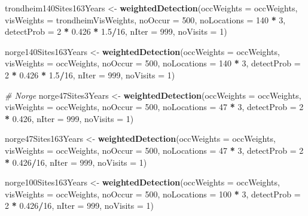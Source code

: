 \documentclass[]{article}
\newenvironment{Shaded}{\begin{snugshade}}{\end{snugshade}}
\newcommand{\KeywordTok}[1]{\textcolor[rgb]{0.13,0.29,0.53}{\textbf{#1}}}
\newcommand{\DataTypeTok}[1]{\textcolor[rgb]{0.13,0.29,0.53}{#1}}
\newcommand{\DecValTok}[1]{\textcolor[rgb]{0.00,0.00,0.81}{#1}}
\newcommand{\FloatTok}[1]{\textcolor[rgb]{0.00,0.00,0.81}{#1}}
\newcommand{\StringTok}[1]{\textcolor[rgb]{0.31,0.60,0.02}{#1}}
\newcommand{\CommentTok}[1]{\textcolor[rgb]{0.56,0.35,0.01}{\textit{#1}}}
\newcommand{\OperatorTok}[1]{\textcolor[rgb]{0.81,0.36,0.00}{\textbf{#1}}}
\newcommand{\NormalTok}[1]{#1}
\begin{document}
\begin{Shaded}
\begin{Highlighting}[]
\NormalTok{trondheim140Sites163Years <-}\StringTok{ }\KeywordTok{weightedDetection}\NormalTok{(}\DataTypeTok{occWeights =}\NormalTok{ occWeights, }\DataTypeTok{visWeights =}\NormalTok{ trondheimVisWeights, }
    \DataTypeTok{noOccur =} \DecValTok{500}\NormalTok{, }\DataTypeTok{noLocations =} \DecValTok{140} \OperatorTok{*}\StringTok{ }\DecValTok{3}\NormalTok{, }\DataTypeTok{detectProb =} \DecValTok{2} \OperatorTok{*}\StringTok{ }\FloatTok{0.426} \OperatorTok{*}\StringTok{ }\FloatTok{1.5}\OperatorTok{/}\DecValTok{16}\NormalTok{, }\DataTypeTok{nIter =} \DecValTok{999}\NormalTok{, }
    \DataTypeTok{noVisits =} \DecValTok{1}\NormalTok{)}

\NormalTok{norge140Sites163Years <-}\StringTok{ }\KeywordTok{weightedDetection}\NormalTok{(}\DataTypeTok{occWeights =}\NormalTok{ occWeights, }\DataTypeTok{visWeights =}\NormalTok{ occWeights, }
    \DataTypeTok{noOccur =} \DecValTok{500}\NormalTok{, }\DataTypeTok{noLocations =} \DecValTok{140} \OperatorTok{*}\StringTok{ }\DecValTok{3}\NormalTok{, }\DataTypeTok{detectProb =} \DecValTok{2} \OperatorTok{*}\StringTok{ }\FloatTok{0.426} \OperatorTok{*}\StringTok{ }\FloatTok{1.5}\OperatorTok{/}\DecValTok{16}\NormalTok{, }\DataTypeTok{nIter =} \DecValTok{999}\NormalTok{, }
    \DataTypeTok{noVisits =} \DecValTok{1}\NormalTok{)}


\CommentTok{# Norge}
\NormalTok{norge47Sites3Years <-}\StringTok{ }\KeywordTok{weightedDetection}\NormalTok{(}\DataTypeTok{occWeights =}\NormalTok{ occWeights, }\DataTypeTok{visWeights =}\NormalTok{ occWeights, }
    \DataTypeTok{noOccur =} \DecValTok{500}\NormalTok{, }\DataTypeTok{noLocations =} \DecValTok{47} \OperatorTok{*}\StringTok{ }\DecValTok{3}\NormalTok{, }\DataTypeTok{detectProb =} \DecValTok{2} \OperatorTok{*}\StringTok{ }\FloatTok{0.426}\NormalTok{, }\DataTypeTok{nIter =} \DecValTok{999}\NormalTok{, }
    \DataTypeTok{noVisits =} \DecValTok{1}\NormalTok{)}

\NormalTok{norge47Sites163Years <-}\StringTok{ }\KeywordTok{weightedDetection}\NormalTok{(}\DataTypeTok{occWeights =}\NormalTok{ occWeights, }\DataTypeTok{visWeights =}\NormalTok{ occWeights, }
    \DataTypeTok{noOccur =} \DecValTok{500}\NormalTok{, }\DataTypeTok{noLocations =} \DecValTok{47} \OperatorTok{*}\StringTok{ }\DecValTok{3}\NormalTok{, }\DataTypeTok{detectProb =} \DecValTok{2} \OperatorTok{*}\StringTok{ }\FloatTok{0.426}\OperatorTok{/}\DecValTok{16}\NormalTok{, }\DataTypeTok{nIter =} \DecValTok{999}\NormalTok{, }
    \DataTypeTok{noVisits =} \DecValTok{1}\NormalTok{)}

\NormalTok{norge100Sites163Years <-}\StringTok{ }\KeywordTok{weightedDetection}\NormalTok{(}\DataTypeTok{occWeights =}\NormalTok{ occWeights, }\DataTypeTok{visWeights =}\NormalTok{ occWeights, }
    \DataTypeTok{noOccur =} \DecValTok{500}\NormalTok{, }\DataTypeTok{noLocations =} \DecValTok{100} \OperatorTok{*}\StringTok{ }\DecValTok{3}\NormalTok{, }\DataTypeTok{detectProb =} \DecValTok{2} \OperatorTok{*}\StringTok{ }\FloatTok{0.426}\OperatorTok{/}\DecValTok{16}\NormalTok{, }\DataTypeTok{nIter =} \DecValTok{999}\NormalTok{, }
    \DataTypeTok{noVisits =} \DecValTok{1}\NormalTok{)}



\end{Highlighting}
\end{Shaded}
\end{document}
